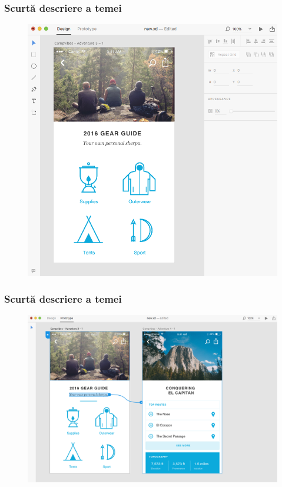\documentclass{beamer}
\begin{document}

\begin{frame}
\frametitle{Scurtă descriere a temei}
\begin{figure}
\includegraphics[scale=0.2]{img/all.png}
\end{figure}
\end{frame}


\begin{frame}
\frametitle{Scurtă descriere a temei}
\begin{figure}
\includegraphics[scale=0.2]{img/tranzitie.png}
\end{figure}
\end{frame}
\end{document}
